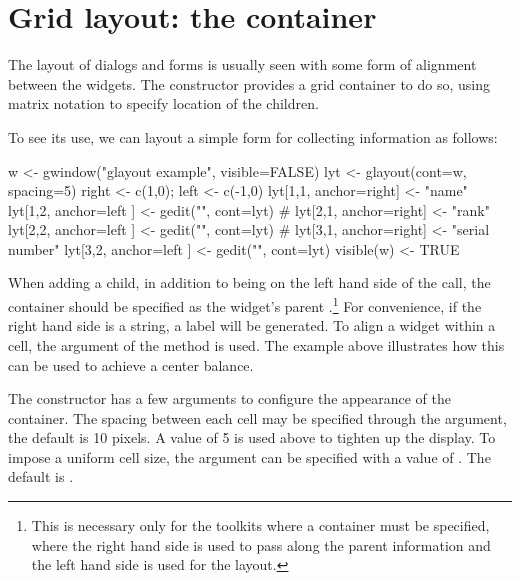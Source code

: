 


\section{Grid layout: the  container}
\label{sec:gWidgets-glayout-container}

The layout of dialogs and forms is usually seen with some form of
alignment between the widgets. The  constructor
provides a grid container to do so, using matrix notation to specify
location of the children.  

To see its use, we can layout a simple form for collecting information
as follows:

\begin{Schunk}
\begin{Sinput}
 w <- gwindow("glayout example", visible=FALSE)
 lyt <- glayout(cont=w, spacing=5)
 right <- c(1,0); left <- c(-1,0)
 lyt[1,1, anchor=right] <- "name"
 lyt[1,2, anchor=left ] <- gedit("", cont=lyt)
 #
 lyt[2,1, anchor=right] <- "rank"
 lyt[2,2, anchor=left ] <- gedit("", cont=lyt)
 #
 lyt[3,1, anchor=right] <- "serial number"
 lyt[3,2, anchor=left ] <- gedit("", cont=lyt)
 visible(w) <- TRUE
\end{Sinput}
\end{Schunk}
%

When adding a child, in addition to being on the left hand side of the
\code{[\ASSIGN} call, the  container should be specified
as the widget's parent .\footnote{This is necessary
  only for the toolkits where a container must be specified, where the
  right hand side is used to pass along the parent information and the
  left hand side is used for the layout.} For convenience, if the
right hand side is a string, a label will be generated.  To align a
widget within a cell, the  argument of the
\code{[\ASSIGN}{glayout} method is used. The example above illustrates
how this can be used to achieve a center balance.

The constructor has a few arguments to configure the appearance of the
container. The spacing between each cell may be specified through the
 argument, the default is 10 pixels. A
value of 5 is used above to tighten up the display.
To impose a uniform cell size, the 
argument can be specified with a value of . The default is
. 

